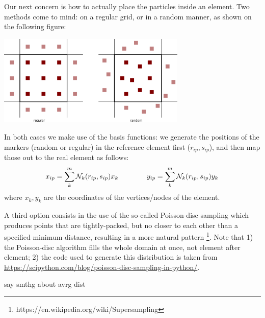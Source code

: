Our next concern is how to actually place the particles inside an element. 
Two methods come to mind: on a regular grid, or in a random manner, 
as shown on the following figure:

\begin{center}
\includegraphics[width=9cm]{python_codes/fieldstone_13/images/markers} 
\end{center}

In both cases we make use of the basis functions: we generate the 
positions of the markers (random or regular) in the reference
element first ($r_{ip},s_{ip}$), and then map those out to the real element as follows:
\begin{equation}
x_{ip}=\sum_k^m {\mathcal{N}}_k(r_{ip},s_{ip}) x_k
\quad\quad\quad\quad
y_{ip}=\sum_k^m {\mathcal{N}}_k(r_{ip},s_{ip}) y_k
\end{equation}
where $x_k,y_k$ are the coordinates of the vertices/nodes of the element.

A third option consists in the use of the so-called Poisson-disc sampling which 
produces points that are tightly-packed, but no closer to each other than 
a specified minimum distance, resulting in a more natural pattern 
\footnote{https://en.wikipedia.org/wiki/Supersampling}. Note that 
1) the Poisson-disc algorithm fills the whole domain at once, not element after element;
2) the code used to generate this distribution is taken from 
\url{https://scipython.com/blog/poisson-disc-sampling-in-python/}.

{\color{red} say smthg about avrg dist}  

